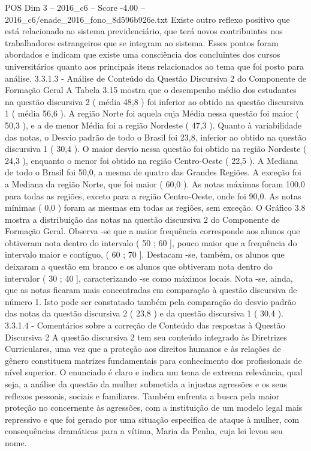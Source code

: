 \begin{textsample}{POS Dim 3 – 2016\_c6 – Score -4.00 – 2016\_c6/enade\_2016\_fono\_8d596b926e.txt}
Existe outro reflexo positivo que está relacionado ao sistema previdenciário, que terá novos contribuintes nos trabalhadores estrangeiros que se integram ao sistema.
Esses pontos foram abordados e indicam que existe uma consciência dos concluintes dos cursos universitários quanto aos principais itens relacionados ao tema que foi posto para análise. 3.3.1.3 - Análise de Conteúdo da Questão Discursiva 2 do Componente de Formação Geral A Tabela 3.15 mostra que o desempenho médio dos estudantes na questão discursiva 2 ( média 48,8 ) foi inferior ao obtido na questão discursiva 1 ( média 56,6 ).
A região Norte foi aquela cuja Média nessa questão foi maior ( 50,3 ), e a de menor Média foi a região Nordeste ( 47,3 ).
Quanto à variabilidade das notas, o Desvio padrão de todo o Brasil foi 23,8, inferior ao obtido na questão discursiva 1 ( 30,4 ).
O maior desvio nessa questão foi obtido na região Nordeste ( 24,3 ), enquanto o menor foi obtido na região Centro-Oeste ( 22,5 ).
A Mediana de todo o Brasil foi 50,0, a mesma de quatro das Grandes Regiões.
A exceção foi a Mediana da região Norte, que foi maior ( 60,0 ).
As notas máximas foram 100,0 para todas as regiões, exceto para a região Centro-Oeste, onde foi 90,0.
As notas mínimas ( 0,0 ) foram as mesmas em todas as regiões, sem exceção.
O Gráfico 3.8 mostra a distribuição das notas na questão discursiva 2 do Componente de Formação Geral.
Observa -se que a maior frequência corresponde aos alunos que obtiveram nota dentro do intervalo ( 50 ; 60 ], pouco maior que a frequência do intervalo maior e contíguo, ( 60 ; 70 ].
Destacam -se, também, os alunos que deixaram a questão em branco e os alunos que obtiveram nota dentro do intervalor ( 30 ; 40 ], caracterizando -se como máximos locais.
Nota -se, ainda, que as notas ficaram mais concentradas em comparação à questão discursiva de número 1.
Isto pode ser constatado também pela comparação do desvio padrão das notas da questão discursiva 2 ( 23,8 ) e da questão discursiva 1 ( 30,4 ). 3.3.1.4 - Comentários sobre a correção de Conteúdo das respostas à Questão Discursiva 2 A questão discursiva 2 tem seu conteúdo integrado às Diretrizes Curriculares, uma vez que a proteção aos direitos humanos e às relações de gênero constituem matrizes fundamentais para conhecimento dos profissionais de nível superior.
O enunciado é claro e indica um tema de extrema relevância, qual seja, a análise da questão da mulher submetida a injustas agressões e os seus reflexos pessoais, sociais e familiares.
Também enfrenta a busca pela maior proteção no concernente às agressões, com a instituição de um modelo legal mais repressivo e que foi gerado por uma situação especifica de ataque à mulher, com consequências dramáticas para a vítima, Maria da Penha, cuja lei levou seu nome.

\end{textsample}
